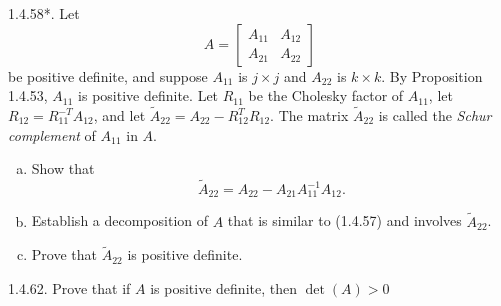 \documentclass{report}
\begin{document}
    \pagebreak \bigbreak \noindent 
    \begin{mdframed}
        1.4.58*.
        Let 
        \[
            A = 
            \begin{bmatrix}
                A_{11} & A_{12} \\
                A_{21} & A_{22}
            \end{bmatrix}
        \]
        be positive definite, and suppose $A_{11}$ is $j \times j$ and 
        $A_{22}$ is $k \times k$. By Proposition 1.4.53, $A_{11}$ is positive definite. 
        Let $R_{11}$ be the Cholesky factor of $A_{11}$, let $R_{12} = R_{11}^{-T} A_{12}$, 
        and let $\tilde{A}_{22} = A_{22} - R_{12}^{T} R_{12}$. The matrix $\tilde{A}_{22}$ is 
        called the \emph{Schur complement} of $A_{11}$ in $A$.
        \begin{enumerate}[(a)]
            \item Show that 
                \[
                    \tilde{A}_{22} = A_{22} - A_{21} A_{11}^{-1} A_{12}.
                \]
            \item Establish a decomposition of $A$ that is similar to (1.4.57) and involves $\tilde{A}_{22}$.
            \item Prove that $\tilde{A}_{22}$ is positive definite.
        \end{enumerate}
    \end{mdframed}

    \pagebreak \bigbreak \noindent 
    \begin{mdframed}
        1.4.62. Prove that if $A$ is positive definite, then $\det(A) > 0$
    \end{mdframed}
\end{document}
